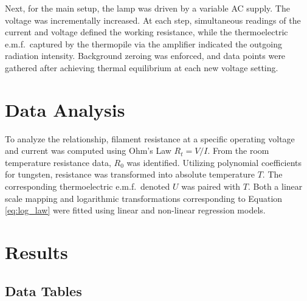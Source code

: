 \documentclass[journal]{IEEEtran}
\begin{document}
Next, for the main setup, the lamp was driven by a variable AC supply. The voltage was incrementally increased. At each step, simultaneous readings of the current and voltage defined the working resistance, while the thermoelectric e.m.f.\ captured by the thermopile via the amplifier indicated the outgoing radiation intensity. Background zeroing was enforced, and data points were gathered after achieving thermal equilibrium at each new voltage setting.

\section{Data Analysis}

To analyze the relationship, filament resistance at a specific operating voltage and current was computed using Ohm's Law $R_t = V/I$. From the room temperature resistance data, $R_0$ was identified. Utilizing polynomial coefficients for tungsten, resistance was transformed into absolute temperature $T$. The corresponding thermoelectric e.m.f.\ denoted $U$ was paired with $T$. Both a linear scale mapping and logarithmic transformations corresponding to Equation \eqref{eq:log_law} were fitted using linear and non-linear regression models.

\section{Results}

\subsection{Data Tables}

\begin{table}[H]
    \centering
    \caption{Room temperature filament measurements.}
    \label{tab:data1}
\end{table}

\begin{table}[H]
    \centering
    \caption{Measured high-temperature operational parameters.}
    \label{tab:data2}
\end{table}
\end{document}

